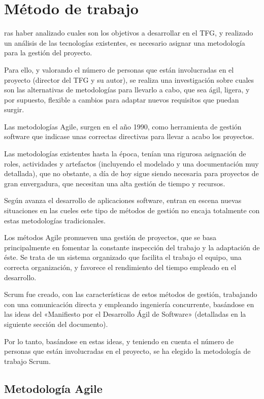 \chapter{Método de trabajo}
\label{chap:metodo}
ras haber analizado cuales son los objetivos a desarrollar en el TFG, y realizado un análisis de las tecnologías existentes, es necesario asignar una metodología para la gestión del proyecto. 

Para ello, y valorando el número de personas que están involucradas en el proyecto (director del TFG y su autor), se realiza una investigación sobre cuales son las alternativas de metodologías para llevarlo a cabo, que sea ágil, ligera, y por supuesto, flexible a cambios para adaptar nuevos requisitos que puedan surgir.

Las metodologías Agile, surgen en el año 1990, como herramienta de gestión software que indicase unas correctas directivas para llevar a acabo los proyectos. 

Las metodologías existentes hasta la época, tenían una rigurosa asignación de roles, actividades y artefactos (incluyendo el modelado y una documentación muy detallada), que no obstante, a día de hoy sigue siendo necesaria para proyectos de gran envergadura, que necesitan una alta gestión de tiempo y recursos. 

Según avanza el desarrollo de aplicaciones software, entran en escena nuevas situaciones en las cueles este tipo de métodos de gestión no encaja totalmente con estas metodologías tradicionales. 

Los métodos Agile promueven una gestión de proyectos, que se basa principalmente en fomentar la constante inspección del trabajo y la adaptación de éste. Se trata de un sistema organizado que facilita el trabajo el equipo, una correcta organización, y favorece el rendimiento del tiempo empleado en el desarrollo.

Scrum fue creado, con las características de estos métodos de gestión, trabajando con una comunicación directa y empleando ingeniería concurrente, basándose en las ideas del «Manifiesto por el Desarrollo Ágil de Software» (detalladas en la siguiente sección del documento).

Por lo tanto, basándose en estas ideas, y teniendo en cuenta el número de personas que están involucradas en el proyecto, se ha elegido la metodología de trabajo Scrum.


\section{Metodología Agile}



